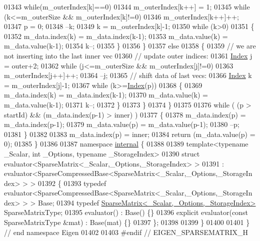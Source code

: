 \begin{DoxyCode}
01343       \textcolor{keywordflow}{while}(m\_outerIndex[k]==0)
01344         m\_outerIndex[k++] = 1;
01345       \textcolor{keywordflow}{while} (k<=m\_outerSize && m\_outerIndex[k]!=0)
01346         m\_outerIndex[k++]++;
01347       p = 0;
01348       --k;
01349       k = m\_outerIndex[k]-1;
01350       \textcolor{keywordflow}{while} (k>0)
01351       \{
01352         m\_data.index(k) = m\_data.index(k-1);
01353         m\_data.value(k) = m\_data.value(k-1);
01354         k--;
01355       \}
01356     \}
01357     \textcolor{keywordflow}{else}
01358     \{
01359       \textcolor{comment}{// we are not inserting into the last inner vec}
01360       \textcolor{comment}{// update outer indices:}
01361       \hyperlink{group___core___module_a554f30542cc2316add4b1ea0a492ff02}{Index} j = outer+2;
01362       \textcolor{keywordflow}{while} (j<=m\_outerSize && m\_outerIndex[j]!=0)
01363         m\_outerIndex[j++]++;
01364       --j;
01365       \textcolor{comment}{// shift data of last vecs:}
01366       \hyperlink{group___core___module_a554f30542cc2316add4b1ea0a492ff02}{Index} k = m\_outerIndex[j]-1;
01367       \textcolor{keywordflow}{while} (k>=\hyperlink{namespace_eigen_a62e77e0933482dafde8fe197d9a2cfde}{Index}(p))
01368       \{
01369         m\_data.index(k) = m\_data.index(k-1);
01370         m\_data.value(k) = m\_data.value(k-1);
01371         k--;
01372       \}
01373     \}
01374   \}
01375 
01376   \textcolor{keywordflow}{while} ( (p > startId) && (m\_data.index(p-1) > inner) )
01377   \{
01378     m\_data.index(p) = m\_data.index(p-1);
01379     m\_data.value(p) = m\_data.value(p-1);
01380     --p;
01381   \}
01382 
01383   m\_data.index(p) = inner;
01384   \textcolor{keywordflow}{return} (m\_data.value(p) = 0);
01385 \}
01386 
01387 \textcolor{keyword}{namespace }\hyperlink{namespaceinternal}{internal} \{
01388 
01389 \textcolor{keyword}{template}<\textcolor{keyword}{typename} \_Scalar, \textcolor{keywordtype}{int} \_Options, \textcolor{keyword}{typename} \_StorageIndex>
01390 \textcolor{keyword}{struct }evaluator<SparseMatrix<\_Scalar,\_Options,\_StorageIndex> >
01391   : evaluator<SparseCompressedBase<SparseMatrix<\_Scalar,\_Options,\_StorageIndex> > >
01392 \{
01393   \textcolor{keyword}{typedef} evaluator<SparseCompressedBase<SparseMatrix<\_Scalar,\_Options,\_StorageIndex> > > Base;
01394   \textcolor{keyword}{typedef} \hyperlink{group___sparse_core___module_class_eigen_1_1_sparse_matrix}{SparseMatrix<\_Scalar,\_Options,\_StorageIndex>} 
      SparseMatrixType;
01395   evaluator() : Base() \{\}
01396   \textcolor{keyword}{explicit} evaluator(\textcolor{keyword}{const} SparseMatrixType &mat) : Base(mat) \{\}
01397 \};
01398 
01399 \}
01400 
01401 \} \textcolor{comment}{// end namespace Eigen}
01402 
01403 \textcolor{preprocessor}{#endif // EIGEN\_SPARSEMATRIX\_H}
\end{DoxyCode}
